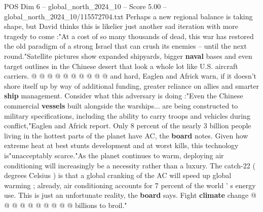 \begin{textsample}{POS Dim 6 – global\_north\_2024\_10 – Score 5.00 – global\_north\_2024\_10/115572704.txt}
Perhaps a new regional balance is taking shape, but David thinks this is likelier just another sad iteration with more tragedy to come :"At a cost of so many thousands of dead, this war has restored the old paradigm of a strong Israel that can crush its enemies -- until the next round."Satellite pictures show expanded shipyards, bigger \textbf{naval} bases and even target outlines in the Chinese desert that look a whole lot like U.S. aircraft carriers. @ @ @ @ @ @ @ @ @ @ and hard, Eaglen and Africk warn, if it doesn't shore itself up by way of additional funding, greater reliance on allies and smarter \textbf{ship} management.
Consider what this adversary is doing :"Even the Chinese commercial \textbf{vessels} built alongside the warships... are being constructed to military specifications, including the ability to carry troops and vehicles during conflict,"Eaglen and Africk report.
Only 8 percent of the nearly 3 billion people living in the hottest parts of the planet have AC, the \textbf{board} notes.
Given how extreme heat at best stunts development and at worst kills, this technology is"unacceptably scarce."As the planet continues to warm, deploying air conditioning will increasingly be a necessity rather than a luxury.
The catch-22 ( degrees Celsius ) is that a global cranking of the AC will speed up global warming ; already, air conditioning accounts for 7 percent of the world ' s energy use.
This is just an unfortunate reality, the \textbf{board} says.
Fight \textbf{climate} change @ @ @ @ @ @ @ @ @ @ billions to broil."

\end{textsample}
